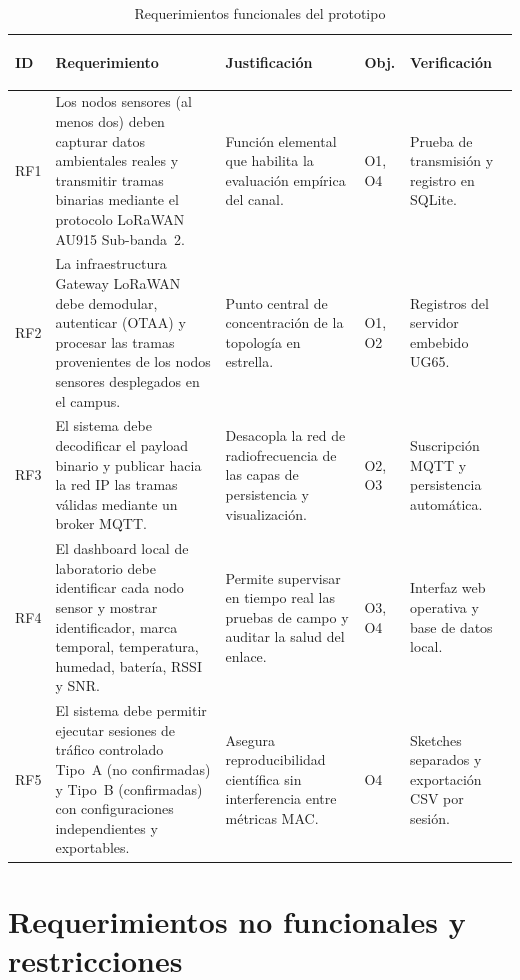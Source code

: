 \documentclass[12pt,oneside,openany,spanish,oldfontcommands]{memoir}
\renewcommand{\arraystretch}{1.15}
\begin{document}
\begin{table}[H]
\centering
\caption{Requerimientos funcionales del prototipo}
\label{tab:rf}
\scriptsize
\setlength{\tabcolsep}{3pt}
\renewcommand{\arraystretch}{0.95}
\begin{tabularx}{\textwidth}{
    >{\bfseries\raggedright\arraybackslash}p{1.0cm}
    >{\raggedright\arraybackslash}X
    >{\raggedright\arraybackslash}p{2.4cm}
    >{\centering\arraybackslash}p{1.3cm}
    >{\raggedright\arraybackslash}p{2.4cm}
}
\toprule
\textbf{ID} &
\textbf{Requerimiento} &
\textbf{Justificación} &
\textbf{Obj.} &
\textbf{Verificación}\\
\midrule
RF1 &
Los nodos sensores (al menos dos) deben capturar datos ambientales reales y transmitir tramas
binarias mediante el protocolo LoRaWAN AU915 Sub-banda~2.
&
Función elemental que habilita la evaluación empírica del canal.
&
O1, O4
&
Prueba de transmisión y registro en SQLite.
\\
\midrule
RF2 &
La infraestructura Gateway LoRaWAN debe demodular, autenticar (OTAA) y procesar las tramas
provenientes de los nodos sensores desplegados en el campus.
&
Punto central de concentración de la topología en estrella.
&
O1, O2
&
Registros del servidor embebido UG65.
\\
\midrule
RF3 &
El sistema debe decodificar el payload binario y publicar hacia la red IP las tramas válidas
mediante un broker MQTT.
&
Desacopla la red de radiofrecuencia de las capas de persistencia y visualización.
&
O2, O3
&
Suscripción MQTT y persistencia automática.
\\
\midrule
RF4 &
El dashboard local de laboratorio debe identificar cada nodo sensor y mostrar identificador,
marca temporal, temperatura, humedad, batería, RSSI y SNR.
&
Permite supervisar en tiempo real las pruebas de campo y auditar la salud del enlace.
&
O3, O4
&
Interfaz web operativa y base de datos local.
\\
\midrule
RF5 &
El sistema debe permitir ejecutar sesiones de tráfico controlado Tipo~A (no confirmadas) y
Tipo~B (confirmadas) con configuraciones independientes y exportables.
&
Asegura reproducibilidad científica sin interferencia entre métricas MAC.
&
O4
&
Sketches separados y exportación CSV por sesión.
\\
\bottomrule
\end{tabularx}
\end{table}

\section{Requerimientos no funcionales y restricciones}\label{sec:req-no-funcionales}
\end{document}
